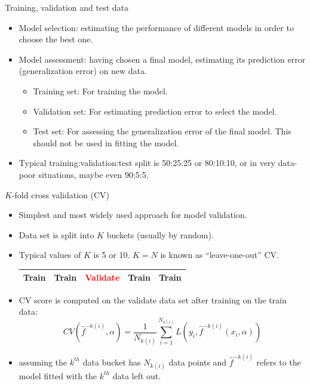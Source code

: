 \documentclass[aspectratio=169]{beamer}
\begin{document}
\begin{frame}{Training, validation and test data}
    \begin{itemize}
        \item Model selection: estimating the performance of different models in order to choose the best one.
        \item Model assessment: having chosen a final model, estimating its prediction error (generalization error) on new data.
        \begin{itemize}
            \item Training set: For training the model.
            \item Validation set: For estimating prediction error to select the model.
            \item Test set: For assessing the generalization error of the final model. This should not be used in fitting the model.
        \end{itemize}
        \item Typical training:validation:test split is 50:25:25 or 80:10:10, or in very data-poor situations, maybe even 90:5:5.
    \end{itemize}
\end{frame}


\begin{frame}{$K$-fold cross validation (CV)}
    \begin{itemize}
        \item Simplest and most widely used approach for model validation.
        \item Data set is split into $K$ buckets (usually by random).
        \item Typical values of $K$ is 5 or 10. $K = N$ is known as ``leave-one-out'' CV.
        \begin{table}
        \begin{tabular}{|p{1.7cm}|p{1.7cm}|p{1.7cm}|p{1.7cm}|p{1.7cm}|}
            \hline
            \Large{Train} & \Large{Train} & \textcolor{red}{\Large{Validate}} & \Large{Train} & \Large{Train}\\
            \hline
        \end{tabular}
        \end{table}
        \item CV score is computed on the validate data set after training on the train data:
        \begin{equation*}
                CV(\hat{f}^{-k(i)},\alpha) = \frac{1}{N_{k(i)}}\sum_{i=1}^{N_{k(i)}} L(y_i, \hat{f}^{-k(i)}(x_i,\alpha))
        \end{equation*}
        \item assuming the $k^{th}$ data bucket has $N_{k(i)}$ data points and $\hat{f}^{-k(i)}$ refers to the model fitted with the $k^{th}$ data left out.
    \end{itemize}
\end{frame}
\end{document}
